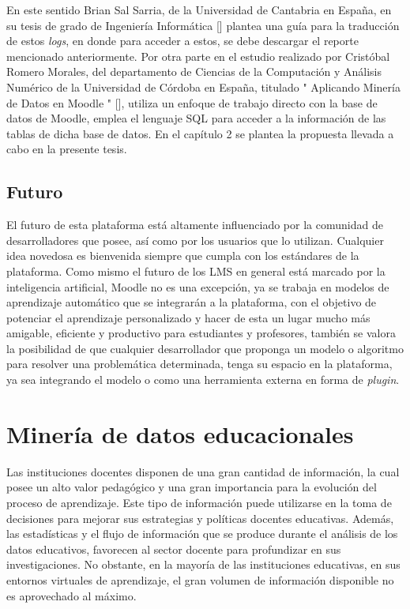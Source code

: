 En este sentido Brian Sal Sarria, de la Universidad de Cantabria en España, en su tesis de grado de Ingeniería Informática [\cite{Sarria_tesis}] plantea una guía para la traducción de estos \textit{logs}, en donde para acceder a estos, se debe descargar el reporte mencionado anteriormente. Por otra parte en el estudio realizado por Cristóbal Romero Morales, del departamento de Ciencias de la Computación y Análisis Numérico de la Universidad de Córdoba en España, titulado " Aplicando Minería de Datos en Moodle " [\cite{Romero_tesis}], utiliza un enfoque de trabajo directo con la base de datos de Moodle, emplea el lenguaje SQL para acceder a la información de las tablas de dicha base de datos. En el capítulo 2 se plantea la propuesta llevada a cabo en la presente tesis.  


\subsection{Futuro}
El futuro de esta plataforma está altamente influenciado por la comunidad de desarrolladores que posee, así como por los usuarios que lo utilizan. Cualquier idea novedosa es bienvenida siempre que cumpla con los estándares de la plataforma. Como mismo el futuro de los LMS en general está marcado por la inteligencia artificial, Moodle no es una excepción, ya se trabaja en modelos de aprendizaje automático que se integrarán a la plataforma, con el objetivo de potenciar el aprendizaje personalizado y hacer de esta un lugar mucho más amigable, eficiente y productivo para estudiantes y profesores, también se valora la posibilidad de que cualquier desarrollador que proponga un modelo o algoritmo para resolver una problemática determinada, tenga su espacio en la plataforma, ya sea integrando el modelo o como una herramienta externa en forma de \textit{plugin}.  


\section{Minería de datos educacionales}

Las instituciones docentes disponen de una gran cantidad de información, la cual posee un alto valor pedagógico y una gran importancia para la evolución del proceso de aprendizaje. Este tipo de información puede utilizarse en la toma de decisiones para mejorar sus estrategias y políticas docentes educativas. Además, las estadísticas y el flujo de información que se produce durante el análisis de los datos educativos, favorecen al sector docente para profundizar en sus investigaciones. No obstante, en la mayoría de las instituciones educativas, en sus entornos virtuales de aprendizaje, el gran volumen de información disponible no es aprovechado al máximo.  


